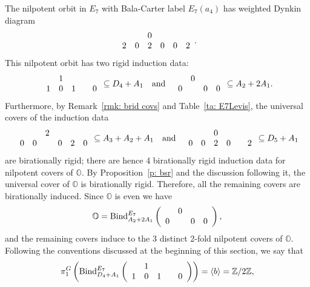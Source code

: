 \documentclass[11pt]{amsart}
\renewcommand{\O}{{\mathbb O}}
\newcommand{\bZ}{{\mathbb Z}}
\newcommand{\BInd}{{{\mbox{\rm Bind}}}}
\numberwithin{equation}{section}
\begin{document}
	The nilpotent orbit in $E_7$ with Bala-Carter label $E_7(a_4)$ has weighted Dynkin diagram
	$$\begin{array}{c c c c c c}
		& & 0 & & & \\
		2 & 0 & 2 & 0 & 0 & 2 \\
	\end{array}.$$
	This nilpotent orbit has two rigid induction data:
	$$\begin{array}{c c c c c c}
		& 1 & & & \\
		1 & 0 & 1 &  & 0 \\
	\end{array}\subseteq D_4 + A_1\quad \mbox{and}\quad \begin{array}{c c c c c}
		& 0&  & \\
		0 & & 0 & 0   \\
	\end{array} \subseteq A_2 + 2 A_1.$$ Furthermore, by Remark~\ref{rmk: brid covs} and Table~\ref{ta: E7Levis}, the universal covers of the induction data $$\begin{array}{c c c c c c c}
		& & 2 & & &\\
		0 & 0 &  & 0 & 2 & 0   \\
	\end{array} \subseteq A_3+A_2 + A_1 \quad \mbox{and}\quad \begin{array}{c c c c c c c}
		& & 0 & & &\\
		0 & 0 & 2 & 0 & & 2   \\
	\end{array} \subseteq D_5 + A_1$$  are birationally rigid; there are hence 4 birationally rigid induction data for nilpotent covers of $\O$. By Proposition~\ref{p: bsr} and the discussion following it, the universal cover of $\O$ is birationally rigid. Therefore, all the remaining covers are birationally induced. Since $\O$ is even we have $$\O=\BInd_{A_2 + 2 A_1}^{E_7}\left(\begin{array}{c c c c c}
	& 0&  & \\
	0 & & 0 & 0   \\
	\end{array}\right),$$ and the remaining covers induce to the 3 distinct 2-fold nilpotent covers of $\O$. 	Following the conventions discussed at the beginning of this section, we say that $$\pi_1^G\left(\BInd_{D_4 + A_1}^{E_7}\left(\begin{array}{c c c c c c}
	& 1 & & & \\
	1 & 0 & 1 &  & 0 \\
	\end{array}\right)\right)=\langle b\rangle=\bZ/2\bZ,$$
\end{document}
